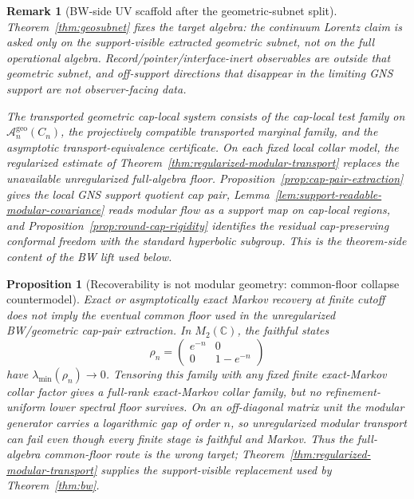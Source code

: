 \documentclass[11pt]{article}
\newtheorem{proposition}[theorem]{Proposition}
\newtheorem{remark}[theorem]{Remark}
\begin{document}
\begin{remark}[BW-side UV scaffold after the geometric-subnet split]
Theorem~\ref{thm:geosubnet} fixes the target algebra: the continuum Lorentz claim is asked only on the support-visible extracted geometric subnet, not on the full operational algebra. Record/pointer/interface-inert observables are outside that geometric subnet, and off-support directions that disappear in the limiting GNS support are not observer-facing data.

The transported geometric cap-local system consists of the cap-local test family on \(\mathcal A_n^{\mathrm{geo}}(C_n)\), the projectively compatible transported marginal family, and the asymptotic transport-equivalence certificate. On each fixed local collar model, the regularized estimate of Theorem~\ref{thm:regularized-modular-transport} replaces the unavailable unregularized full-algebra floor. Proposition~\ref{prop:cap-pair-extraction} gives the local GNS support quotient cap pair, Lemma~\ref{lem:support-readable-modular-covariance} reads modular flow as a support map on cap-local regions, and Proposition~\ref{prop:round-cap-rigidity} identifies the residual cap-preserving conformal freedom with the standard hyperbolic subgroup. This is the theorem-side content of the BW lift used below.
\end{remark}

\begin{proposition}[Recoverability is not modular geometry: common-floor collapse countermodel]\label{prop:commonfloor-collapse}
Exact or asymptotically exact Markov recovery at finite cutoff does not imply the eventual common floor used in the unregularized BW/geometric cap-pair extraction. In \(M_2(\mathbb C)\), the faithful states
\[
\rho_n=\begin{pmatrix}e^{-n}&0\\0&1-e^{-n}\end{pmatrix}
\]
have \(\lambda_{\min}(\rho_n)\to0\). Tensoring this family with any fixed finite exact-Markov collar factor gives a full-rank exact-Markov collar family, but no refinement-uniform lower spectral floor survives. On an off-diagonal matrix unit the modular generator carries a logarithmic gap of order \(n\), so unregularized modular transport can fail even though every finite stage is faithful and Markov. Thus the full-algebra common-floor route is the wrong target; Theorem~\ref{thm:regularized-modular-transport} supplies the support-visible replacement used by Theorem~\ref{thm:bw}.
\end{proposition}
\end{document}
